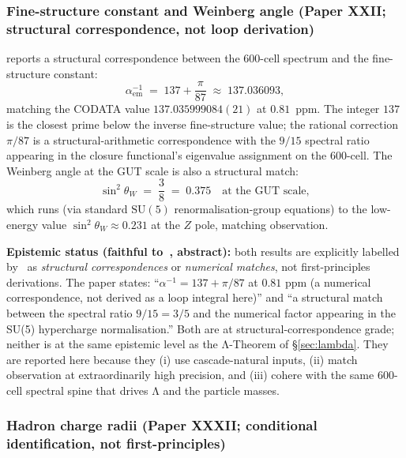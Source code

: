 \documentclass[11pt]{article}
\theoremstyle{plain}
\theoremstyle{definition}
\theoremstyle{remark}
\begin{document}
\subsubsection{Fine-structure constant and Weinberg angle (Paper XXII; structural correspondence, not loop derivation)}

\citet{SmartXXII} reports a structural correspondence between the 600-cell spectrum and the fine-structure constant:
\begin{equation}\label{eq:alpha_em}
  \alpha_\mathrm{em}^{-1} \;=\; 137 + \frac{\pi}{87} \;\approx\; 137.036093,
\end{equation}
matching the CODATA value $137.035999084(21)$ at $0.81$~ppm. The integer $137$ is the closest prime below the inverse fine-structure value; the rational correction $\pi/87$ is a structural-arithmetic correspondence with the $9/15$ spectral ratio appearing in the closure functional's eigenvalue assignment on the 600-cell. The Weinberg angle at the GUT scale is also a structural match:
\begin{equation}\label{eq:weinberg}
  \sin^2\theta_W \;=\; \frac{3}{8} \;=\; 0.375 \quad\text{at the GUT scale},
\end{equation}
which runs (via standard $\mathrm{SU}(5)$ renormalisation-group equations) to the low-energy value $\sin^2\theta_W \approx 0.231$ at the $Z$ pole, matching observation.

\textbf{Epistemic status (faithful to~\citealp{SmartXXII}, abstract):} both results are explicitly labelled by~\citet{SmartXXII} as \emph{structural correspondences} or \emph{numerical matches}, not first-principles derivations. The paper states: ``$\alpha^{-1} = 137 + \pi/87$ at $0.81$ ppm (a numerical correspondence, not derived as a loop integral here)'' and ``a structural match between the spectral ratio $9/15 = 3/5$ and the numerical factor appearing in the SU(5) hypercharge normalisation.'' Both are at structural-correspondence grade; neither is at the same epistemic level as the Λ-Theorem of \S\ref{sec:lambda}. They are reported here because they (i) use cascade-natural inputs, (ii) match observation at extraordinarily high precision, and (iii) cohere with the same 600-cell spectral spine that drives Λ and the particle masses.

\subsubsection{Hadron charge radii (Paper XXXII; conditional identification, not first-principles)}
\end{document}
